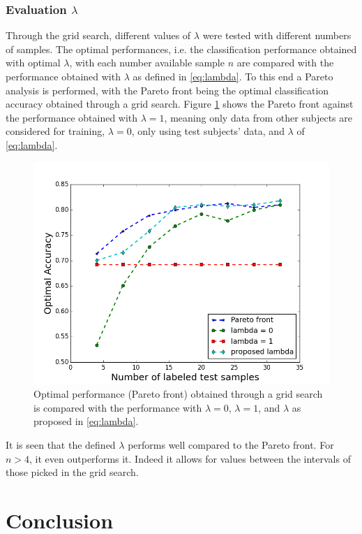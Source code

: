 \subsubsection{Evaluation $\lambda$}

Through the grid search, different values of $\lambda$ were tested with different numbers of samples. 
The optimal performances, i.e. the classification performance obtained with optimal $\lambda$, with each number available sample $n$ are compared with the performance obtained with $\lambda$ as defined in \eqref{eq:lambda}.
To this end a Pareto analysis is performed, with the Pareto front being the optimal classification accuracy obtained through a grid search.
Figure \ref{fig:pareto} shows the Pareto front against the performance obtained with $\lambda=1$, meaning only data from other subjects are considered for training, $\lambda=0$, only using test subjects' data, and $\lambda$ of \eqref{eq:lambda}.

\begin{figure}
\includegraphics[width=1\textwidth]{Figures/pareto}
\caption{Optimal performance (Pareto front) obtained through a grid search is compared with the performance with $\lambda = 0$, $\lambda = 1$, and $\lambda$ as proposed in \eqref{eq:lambda}.}
\label{fig:pareto}
\end{figure}

It is seen that the defined $\lambda$ performs well compared to the Pareto front. For $n > 4$, it even outperforms it. Indeed it allows for values between the intervals of those picked in the grid search. 

\section{Conclusion}
\label{sec:perspective-conclusion}

